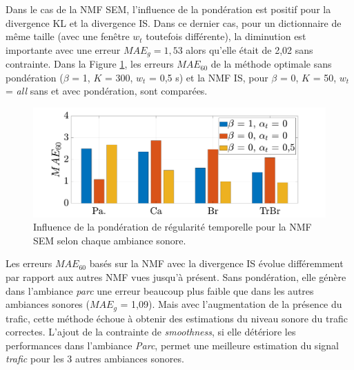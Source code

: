 Dans le cas de la NMF SEM, l'influence de la pondération est positif pour la divergence KL et la divergence IS. Dans ce dernier cas, pour un dictionnaire de même taille (avec une fenêtre $w_t$ toutefois différente), la diminution est importante avec une erreur $MAE_g = 1,53$ alors qu'elle était de 2,02 sans contrainte. 
Dans la Figure \ref{fig:smoothMAE60}, les erreurs $MAE_{60}$ de la méthode optimale sans pondération ($\beta$ = 1, $K$ = 300, $w_t$ = 0,5 s) et la NMF IS, pour $\beta$ = 0, $K$ = 50, $w_t$ = \textit{all} sans et avec pondération, sont comparées. 

\begin{figure}[h!]
\centering
\includegraphics[width=.9\linewidth]{./figures/resultats/grafic_smooth_bar.pdf}
\caption{Influence de la pondération de régularité temporelle pour la NMF SEM selon chaque ambiance sonore.}
\label{fig:smoothMAE60}
\end{figure}

Les erreurs $MAE_{60}$ basés sur la NMF avec la divergence IS évolue différemment par rapport aux autres NMF vues jusqu'à présent. Sans pondération, elle génère dans l'ambiance \textit{parc} une erreur beaucoup plus faible que dans les autres ambiances sonores ($MAE_g$ = 1,09). Mais avec l'augmentation de la présence du trafic, cette méthode échoue à obtenir des estimations du niveau sonore du trafic correctes. L'ajout de la contrainte de \textit{smoothness}, si elle détériore les performances dans l'ambiance \textit{Parc}, permet une meilleure estimation du signal \textit{trafic} pour les 3 autres ambiances sonores.

